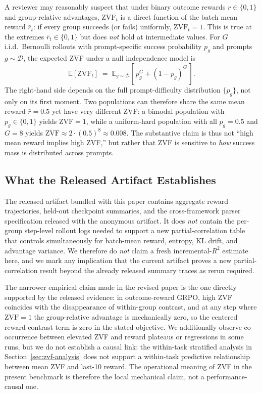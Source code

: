 A reviewer may reasonably suspect that under binary outcome rewards
$r \in \{0,1\}$ and group-relative advantages, $\mathrm{ZVF}_t$ is a direct
function of the batch mean reward $\bar{r}_t$: if every group succeeds
(or fails) uniformly, $\mathrm{ZVF}_t = 1$. This is true at the extremes
$\bar{r}_t \in \{0,1\}$ but does \emph{not} hold at intermediate values.
For $G$ i.i.d.~Bernoulli rollouts with prompt-specific success probability
$p_g$ and prompts $g \sim \mathcal{D}$, the expected ZVF under a null independence model is
\begin{equation}
\mathbb{E}[\mathrm{ZVF}_t] \;=\; \mathbb{E}_{g \sim \mathcal{D}}\!\left[\,p_g^{G} + (1-p_g)^{G}\,\right].
\end{equation}
The right-hand side depends on the full prompt-difficulty distribution
$\{p_g\}$, not only on its first moment. Two populations can therefore
share the same mean reward $\bar r = 0.5$ yet have very different ZVF:
a bimodal population with $p_g \in \{0,1\}$ yields $\mathrm{ZVF}=1$,
while a uniform-hard population with all $p_g = 0.5$ and $G=8$ yields
$\mathrm{ZVF} \approx 2 \cdot (0.5)^8 \approx 0.008$. The substantive
claim is thus not ``high mean reward implies high ZVF,'' but rather that
ZVF is sensitive to \emph{how} success mass is distributed across prompts.

\subsection{What the Released Artifact Establishes}

The released artifact bundled with this paper contains aggregate reward
trajectories, held-out checkpoint summaries, and the cross-framework parser
specification released with the anonymous artifact. It does
\emph{not} contain the per-group step-level rollout logs needed to support
a new partial-correlation table that controls simultaneously for
batch-mean reward, entropy, KL drift, and advantage variance. We therefore
do \emph{not} claim a fresh incremental-$R^2$ estimate here, and we mark
any implication that the current artifact proves a new partial-correlation
result beyond the already released summary traces as rerun required.

The narrower empirical claim made in the revised paper is the one directly
supported by the released evidence: in outcome-reward GRPO, high ZVF
coincides with the disappearance of within-group contrast, and at any step
where $\mathrm{ZVF}=1$ the group-relative advantage is mechanically zero, so
the centered reward-contrast term is zero in the stated objective. We additionally observe co-occurrence
between elevated ZVF and reward plateaus or regressions in some runs, but
we do not establish a causal link: the within-task stratified analysis in
Section~\ref{sec:zvf-analysis} does not support a within-task predictive
relationship between mean ZVF and last-10 reward. The operational meaning
of ZVF in the present benchmark is therefore the local mechanical claim,
not a performance-causal one.

